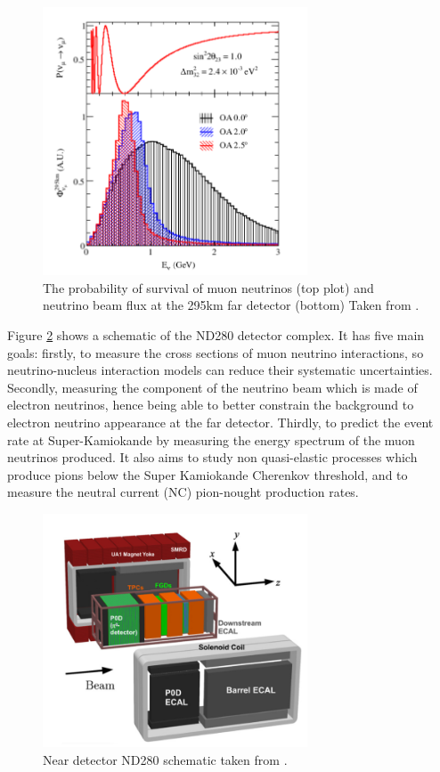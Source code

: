 \begin{figure}
    \centering
    \includegraphics[width=0.7\textwidth]{Figures/nuprobosc.png}
    \caption{The probability of survival of muon neutrinos (top plot) and neutrino beam flux at the 295km far detector (bottom) Taken from \cite{t2k_collaboration_t2k_2013}.}
    \label{fig:nuprobosc}
\end{figure}

Figure \ref{fig:ND280_schematic} shows a schematic of the ND280 detector complex. It has five main goals: firstly, to measure the cross sections of muon neutrino interactions, so neutrino-nucleus interaction models can reduce their systematic uncertainties. Secondly, measuring the component of the neutrino beam which is made of electron neutrinos, hence being able to better constrain the background to electron neutrino appearance at the far detector. Thirdly, to predict the event rate at Super-Kamiokande by measuring the energy spectrum of the muon neutrinos produced. It also aims to study non quasi-elastic processes which produce pions below the Super Kamiokande Cherenkov threshold, and to measure the neutral current (NC) pion-nought production rates. 

\begin{figure}
    \centering
    \includegraphics[width=0.7\textwidth]{Figures/nd280_complex.png}
    \caption{Near detector ND280 schematic taken from \cite{t2k_collaboration_t2k_2011}.}
    \label{fig:ND280_schematic}
\end{figure}


